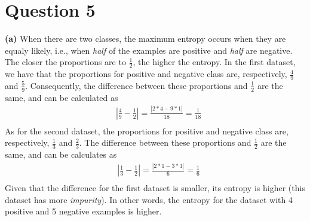 \documentclass[leqno]{article}
\begin{document}
\hfill

\section*{Question 5} \textbf{(a)} When there are two classes, the maximum entropy occurs when they are equaly likely, i.e., 
when \textit{half} of the examples are positive and \textit{half} are negative. The closer the proportions are to $\frac{1}{2}$, 
the higher the entropy. In the first dataset, we have that the proportions for positive and negative class are, respectively, 
$\frac{4}{9}$ and $\frac{5}{9}$. Consequently, the difference between these proportions and $\frac{1}{2}$ are the same, and can 
be calculated as
\begin{equation*}
\begin{split}
&|\frac{4}{9} - \frac{1}{2}| = \frac{|2*4 - 9*1|}{18} = \frac{1}{18} \\
\end{split}
\end{equation*}
As for the second dataset, the proportions for positive and negative class are, respectively, $\frac{1}{3}$ and $\frac{2}{3}$. 
The difference between these proportions and $\frac{1}{2}$ are the same, and can be calculates as 
\begin{equation*}
\begin{split}
&|\frac{1}{3} - \frac{1}{2}| = \frac{|2*1 - 3*1|}{6} = \frac{1}{6} \\
\end{split}
\end{equation*}
Given that the difference for the first dataset is smaller, its entropy is higher (this dataset has more 
\textit{impurity}). In other words, the entropy for the dataset with 4 positive and 
5 negative examples is higher.

\hfill
\end{document}

